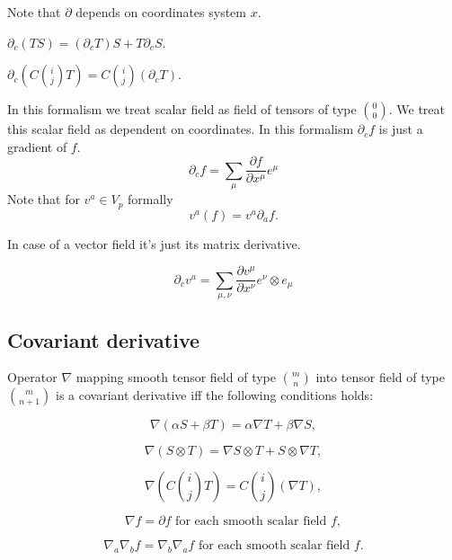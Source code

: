 \documentclass[main.tex]{subfiles}
\begin{document}
Note that $\partial$ depends on coordinates system $x$.

\begin{fact}
$\partial_c(TS) = (\partial_c T) S + T\partial_c S$.
\end{fact}

\begin{fact}
$\partial_c (C\binom{i}{j} T) = C\binom{i}{j} (\partial_c T)$.
\end{fact}

In this formalism we treat scalar field as field of tensors of type $\binom{0}{0}$. We treat this scalar field as dependent on coordinates. In this formalism $\partial_c f$ is just a gradient of $f$.
\begin{equation}
\boxed{\partial_c f = \sum_\mu \frac{\partial f}{\partial x^\mu} e^\mu}
\end{equation}
Note that for $v^a \in V_p$ formally
\begin{equation}
v^a(f) = v^a \partial_a f.
\end{equation}

In case of a vector field it's just its matrix derivative. 

\begin{equation}
\boxed{\partial_c v^a = \sum_{\mu, \nu} \frac{\partial v^\mu}{\partial x^\nu} e^\nu \otimes e_\mu}
\end{equation}

\subsection{Covariant derivative}
\begin{definition}
Operator $\nabla$ mapping smooth tensor field of type $\binom{m}{n}$ into tensor field of type $\binom{m}{n+1}$ is a covariant derivative iff the following conditions holds:

\begin{equation}
\nabla(\alpha S + \beta T) = \alpha \nabla T + \beta \nabla S,
\end{equation}

\begin{equation}
\nabla(S\otimes T) = \nabla S \otimes T + S \otimes \nabla T,
\end{equation}

\begin{equation}
\nabla (C\binom{i}{j} T) = C\binom{i}{j} (\nabla T),
\end{equation}

\begin{equation}
\nabla f = \partial f \text{ for each smooth scalar field } f,
\end{equation}

\begin{equation}
\nabla_a \nabla_b f = \nabla_b \nabla_a f \text{ for each smooth scalar field } f.
\end{equation} 

\end{definition}
\end{document}
